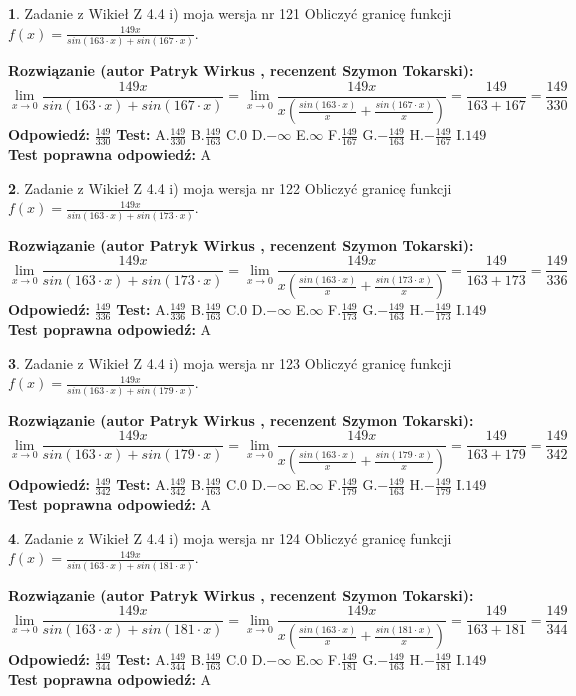 \documentclass[12pt, a4paper]{article}
\theoremstyle{definition} %
\newtheorem{zad}{}
\newcommand{\zadStart}[1]{\begin{zad}#1\newline}
\newcommand{\zadStop}{\end{zad}}
\newcommand{\rozwStart}[2]{\noindent \textbf{Rozwiązanie (autor #1 , recenzent #2): }\newline}
\newcommand{\rozwStop}{\newline}
\newcommand{\odpStart}{\noindent \textbf{Odpowiedź:}\newline}
\newcommand{\odpStop}{\newline}
\newcommand{\testStart}{\noindent \textbf{Test:}\newline}
\newcommand{\testStop}{\newline}
\newcommand{\kluczStart}{\noindent \textbf{Test poprawna odpowiedź:}\newline}
\newcommand{\kluczStop}{\newline}
\begin{document}
\zadStart{Zadanie z Wikieł Z 4.4 i) moja wersja nr 121}
Obliczyć granicę funkcji $f(x)=\frac{149x}{sin(163\cdot x) +sin(167\cdot x)}$.
\zadStop
\rozwStart{Patryk Wirkus}{Szymon Tokarski}
$$\lim\limits_{x\to 0}\frac{149x}{sin(163\cdot x) +sin(167\cdot x)}=\lim\limits_{x\to 0}\frac{149x}{x(\frac{sin(163\cdot x)}{x}+\frac{sin(167\cdot x)}{x})}=\frac{149}{163+167} = \frac{149}{330}$$
\rozwStop
\odpStart
$\frac{149}{330}$
\odpStop
\testStart
A.$\frac{149}{330}$
B.$\frac{149}{163}$
C.$0$
D.$-\infty$
E.$\infty$
F.$\frac{149}{167}$
G.$-\frac{149}{163}$
H.$-\frac{149}{167}$
I.$149$
\testStop
\kluczStart
A
\kluczStop



\zadStart{Zadanie z Wikieł Z 4.4 i) moja wersja nr 122}
Obliczyć granicę funkcji $f(x)=\frac{149x}{sin(163\cdot x) +sin(173\cdot x)}$.
\zadStop
\rozwStart{Patryk Wirkus}{Szymon Tokarski}
$$\lim\limits_{x\to 0}\frac{149x}{sin(163\cdot x) +sin(173\cdot x)}=\lim\limits_{x\to 0}\frac{149x}{x(\frac{sin(163\cdot x)}{x}+\frac{sin(173\cdot x)}{x})}=\frac{149}{163+173} = \frac{149}{336}$$
\rozwStop
\odpStart
$\frac{149}{336}$
\odpStop
\testStart
A.$\frac{149}{336}$
B.$\frac{149}{163}$
C.$0$
D.$-\infty$
E.$\infty$
F.$\frac{149}{173}$
G.$-\frac{149}{163}$
H.$-\frac{149}{173}$
I.$149$
\testStop
\kluczStart
A
\kluczStop



\zadStart{Zadanie z Wikieł Z 4.4 i) moja wersja nr 123}
Obliczyć granicę funkcji $f(x)=\frac{149x}{sin(163\cdot x) +sin(179\cdot x)}$.
\zadStop
\rozwStart{Patryk Wirkus}{Szymon Tokarski}
$$\lim\limits_{x\to 0}\frac{149x}{sin(163\cdot x) +sin(179\cdot x)}=\lim\limits_{x\to 0}\frac{149x}{x(\frac{sin(163\cdot x)}{x}+\frac{sin(179\cdot x)}{x})}=\frac{149}{163+179} = \frac{149}{342}$$
\rozwStop
\odpStart
$\frac{149}{342}$
\odpStop
\testStart
A.$\frac{149}{342}$
B.$\frac{149}{163}$
C.$0$
D.$-\infty$
E.$\infty$
F.$\frac{149}{179}$
G.$-\frac{149}{163}$
H.$-\frac{149}{179}$
I.$149$
\testStop
\kluczStart
A
\kluczStop



\zadStart{Zadanie z Wikieł Z 4.4 i) moja wersja nr 124}
Obliczyć granicę funkcji $f(x)=\frac{149x}{sin(163\cdot x) +sin(181\cdot x)}$.
\zadStop
\rozwStart{Patryk Wirkus}{Szymon Tokarski}
$$\lim\limits_{x\to 0}\frac{149x}{sin(163\cdot x) +sin(181\cdot x)}=\lim\limits_{x\to 0}\frac{149x}{x(\frac{sin(163\cdot x)}{x}+\frac{sin(181\cdot x)}{x})}=\frac{149}{163+181} = \frac{149}{344}$$
\rozwStop
\odpStart
$\frac{149}{344}$
\odpStop
\testStart
A.$\frac{149}{344}$
B.$\frac{149}{163}$
C.$0$
D.$-\infty$
E.$\infty$
F.$\frac{149}{181}$
G.$-\frac{149}{163}$
H.$-\frac{149}{181}$
I.$149$
\testStop
\kluczStart
A
\kluczStop
\end{document}
